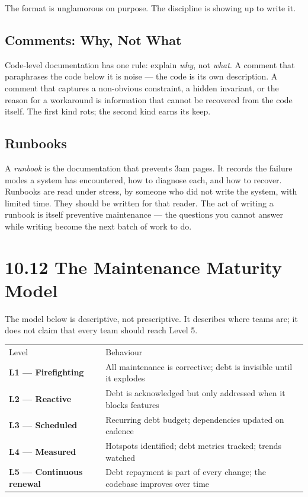 \documentclass[11pt,a4paper]{book}
\begin{document}
The format is unglamorous on purpose. The discipline is showing up to write it.

\subsection{Comments: Why, Not What}

Code-level documentation has one rule: explain \textit{why}, not \textit{what}. A comment that paraphrases the code below it is noise --- the code is its own description. A comment that captures a non-obvious constraint, a hidden invariant, or the reason for a workaround is information that cannot be recovered from the code itself. The first kind rots; the second kind earns its keep.

\subsection{Runbooks}

A \textit{runbook} is the documentation that prevents 3am pages. It records the failure modes a system has encountered, how to diagnose each, and how to recover. Runbooks are read under stress, by someone who did not write the system, with limited time. They should be written for that reader. The act of writing a runbook is itself preventive maintenance --- the questions you cannot answer while writing become the next batch of work to do.

\medskip

\section{10.12 The Maintenance Maturity Model}

The model below is descriptive, not prescriptive. It describes where teams are; it does not claim that every team should reach Level 5.

\begin{tabular}{ll}
\hline
Level & Behaviour \\
\textbf{L1 --- Firefighting} & All maintenance is corrective; debt is invisible until it explodes \\
\textbf{L2 --- Reactive} & Debt is acknowledged but only addressed when it blocks features \\
\textbf{L3 --- Scheduled} & Recurring debt budget; dependencies updated on cadence \\
\textbf{L4 --- Measured} & Hotspots identified; debt metrics tracked; trends watched \\
\textbf{L5 --- Continuous renewal} & Debt repayment is part of every change; the codebase improves over time \\
\hline
\end{tabular}
\end{document}
